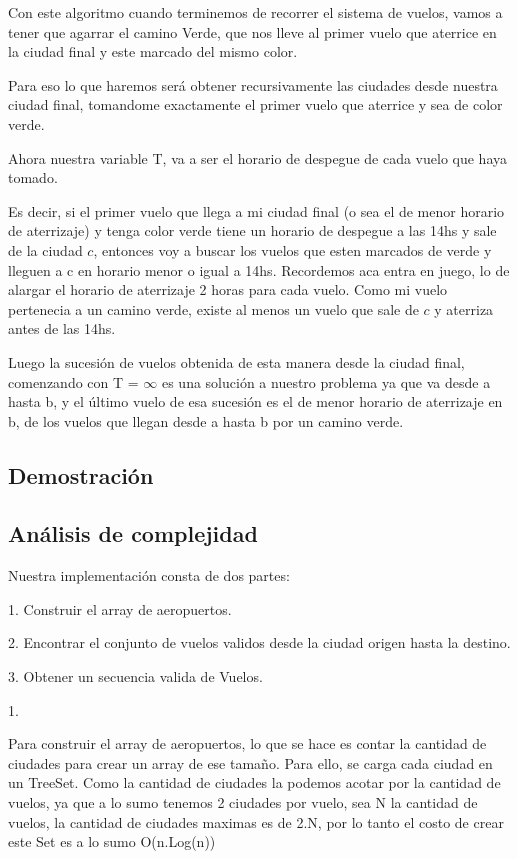 Con este algoritmo cuando terminemos de recorrer el sistema de vuelos, vamos a tener que agarrar el camino Verde, que nos lleve al primer vuelo que aterrice en la ciudad final y este marcado del mismo color.

Para eso lo que haremos ser\'a obtener recursivamente las ciudades desde nuestra ciudad final, tomandome exactamente el primer vuelo que aterrice y sea de color verde.

Ahora nuestra variable T, va a ser el horario de despegue de cada vuelo que haya tomado. 

Es decir, si el primer vuelo que llega a mi ciudad final (o sea el de menor horario de aterrizaje) y tenga color verde tiene un horario de despegue a las 14hs y sale de la ciudad $c$, entonces voy a buscar los vuelos que esten marcados de verde y lleguen a c en horario menor o igual a 14hs. Recordemos aca entra en juego, lo de alargar el horario de aterrizaje 2 horas para cada vuelo.
Como mi vuelo pertenecia a un camino verde, existe al menos un vuelo que sale de $c$ y aterriza antes de las 14hs.

Luego la sucesi\'on de vuelos obtenida de esta manera desde la ciudad final, comenzando con T = $\infty$ es una soluci\'on a nuestro problema ya que va desde a hasta b, y el \'ultimo vuelo de esa sucesi\'on es el de menor horario de aterrizaje en b, de los vuelos que llegan desde a hasta b por un camino verde.

\subsection{Demostración}
\newpage

\subsection{Análisis de complejidad}
Nuestra implementaci\'on consta de dos partes:

1. Construir el array de aeropuertos.

2. Encontrar el conjunto de vuelos validos desde la ciudad origen hasta la destino.

3. Obtener un secuencia valida de Vuelos.

1.

Para construir el array de aeropuertos, lo que se hace es contar la cantidad de ciudades para crear un array de ese tamaño.
Para ello, se carga cada ciudad en un TreeSet. Como la cantidad de ciudades la podemos acotar por la cantidad de vuelos, ya que a lo sumo tenemos 2 ciudades por vuelo, sea N la cantidad de vuelos, la cantidad de ciudades maximas es de 2.N, por lo tanto el costo de crear este Set es a lo sumo O(n.Log(n))

